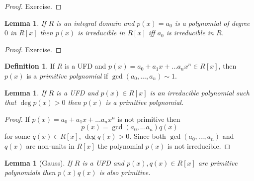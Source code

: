 \documentclass[12pt, letterpaper, oneside]{article}
\theoremstyle{plain}
\newtheorem{lemma}[theorem]{Lemma}
\theoremstyle{definition}
\newtheorem{definition}[theorem]{Definition}
\newcommand{\vs}{\vskip 5mm}
\begin{document}
 \vs
 
 \begin{proof}
 Exercise.
 \end{proof}


\vs\vs

 
\begin{lemma}
\label{LEMMA_IRREDZERODEGPOLY}
If $R$ is an integral domain and $p(x) = a_{0}$ is a polynomial of degree $0$ in $R[x]$ then 
$p(x)$ is irreducible in $R[x]$ iff $a_{0}$ is irreducible in $R$.
\end{lemma} 
 
 \vs
 
 \begin{proof}
 Exercise.
 \end{proof}




\vs\vs

\begin{definition}
If $R$ is a UFD and $p(x) = a_{0} + a_{1}x + \dots a_{n}x^{n} \in R[x]$, then $p(x)$
is a \emph{primitive polynomial} if $\gcd(a_{0}, \dots, a_{n}) \sim 1$.
\end{definition}
 
 
\vs\vs

\begin{lemma}
\label{LEMMA_IRREDISPRIMITIVE}
If $R$ is a UFD and $p(x)\in R[x]$ is an irreducible polynomial such that $\deg p(x) > 0$ 
then $p(x)$ is a primitive polynomial.   
\end{lemma} 
 
 \vs
 
 \begin{proof}
 If $p(x)= a_{0}+a_{1}x+\dots a_{n}x^{n}$ is not primitive then
 $$p(x) = \gcd(a_{0}, \dots a_{n})q(x)$$
 for some $q(x)\in R[x]$, $\deg q(x) >0$. Since both $\gcd(a_{0}, \dots, a_{n})$ and 
 $q(x)$ are non-units in $R[x]$ the polynomial $p(x)$ is not irreducible. 
 \end{proof}
 
 \vs\vs
 
 
 \begin{lemma}[Gauss]
 \label{LEMMA_GAUSSPRIMITIVE}
 If $R$ is a UFD and $p(x), q(x)\in R[x]$ are primitive polynomials then 
 $p(x)q(x)$ is also primitive. 
 \end{lemma}
 
 
 \vs 
 
\end{document}
